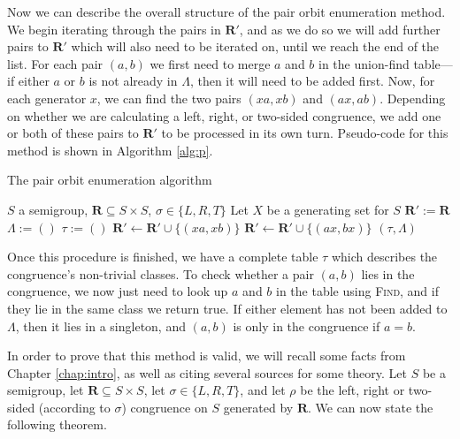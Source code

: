 Now we can describe the overall structure of the pair orbit enumeration method.
We begin iterating through the pairs in $\mathbf{R}'$, and as we do so we
will add further pairs to $\mathbf{R}'$ which will also need to be iterated on,
until we reach the end of the list.  For each pair $(a,b)$ we first need to
merge $a$ and $b$ in the union-find table---if either $a$ or $b$ is not
already in $\Lambda$, then it will need to be added first.  Now,
for each generator $x$, we can find the two pairs $(xa,xb)$ and $(ax,ab)$.
Depending on whether we are calculating a left, right, or two-sided congruence,
we add one or both of these pairs to $\mathbf{R}'$ to be processed in its own
turn.  Pseudo-code for this method is shown in Algorithm \ref{alg:p}.

\begin{algorithm}
\caption{The pair orbit enumeration algorithm}
\label{alg:p}
\begin{algorithmic}[1]
\Require $S$ a semigroup,
         $\mathbf{R} \subseteq S \times S$,
         $\sigma \in \{L, R, T\}$
\State Let $X$ be a generating set for $S$
\State $\mathbf{R}' := \mathbf{R}$
\State $\Lambda := ()$ 
\State $\tau := ()$ 
    \State {}
  \EndIf
    \State {}
  \EndIf
  \State {}
      \State $\mathbf{R}' \gets \mathbf{R}' \cup \{(xa, xb)\}$
    \EndIf
      \State $\mathbf{R}' \gets \mathbf{R}' \cup \{(ax, bx)\}$
    \EndIf
  \EndFor
\EndFor
\State \Return $(\tau, \Lambda)$
\EndProcedure
\end{algorithmic}
\end{algorithm}

Once this procedure is finished, we have a complete table $\tau$ which describes
the congruence's non-trivial classes.  To check whether a pair $(a,b)$ lies in
the congruence, we now just need to look up $a$ and $b$ in the table using
\textsc{Find}, and if they lie in the same class we return true.  If either
element has not been added to $\Lambda$, then it lies in a singleton, and $(a,b)$
is only in the congruence if $a=b$.

In order to prove that this method is valid, we will recall some facts from
Chapter \ref{chap:intro}, as well as citing several sources for some theory.
Let $S$ be a semigroup, let $\mathbf{R} \subseteq S \times S$, let
$\sigma \in \{L, R, T\}$, and let $\rho$ be the left, right or two-sided
(according to $\sigma$) congruence on $S$ generated by $\mathbf{R}$.  We can now
state the following theorem.


